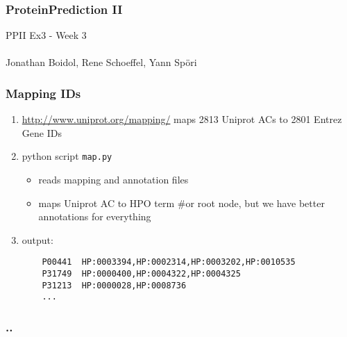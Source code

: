 \documentclass{beamer}
\begin{document}
\begin{frame}
 \frametitle{ProteinPrediction II}
 PPII Ex3 - Week 3\\
 \hfill \\
 Jonathan Boidol, Rene Schoeffel, Yann Sp\"ori
\end{frame}

\begin{frame}[fragile]
 \frametitle{Mapping IDs}
 \begin{enumerate}
 \item \url{http://www.uniprot.org/mapping/} maps 2813 Uniprot ACs to 2801 Entrez Gene IDs
 \item python script \texttt{map.py} 
 	\begin{itemize}
	 \item reads mapping and annotation files
	 \item maps Uniprot AC to HPO term {\color{gray}\#or root node, but we have better annotations for everything}
 	\end{itemize}
 \item output:\\
 \begin{verbatim}
 	P00441  HP:0003394,HP:0002314,HP:0003202,HP:0010535
 	P31749  HP:0000400,HP:0004322,HP:0004325
 	P31213  HP:0000028,HP:0008736
 	...
 \end{verbatim}
\end{enumerate}

\end{frame}

\begin{frame}
 \frametitle{..}
 
\end{frame}
\end{document}
